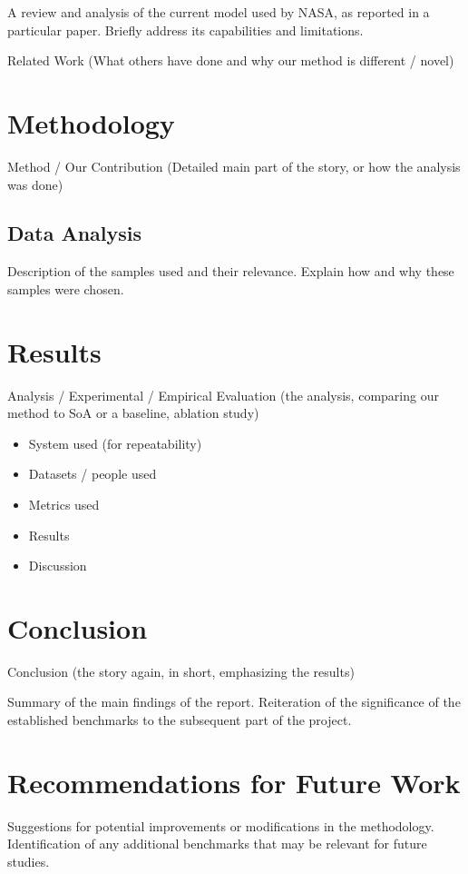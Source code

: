 A review and analysis of the current model used by NASA, as reported in a particular paper.
Briefly address its capabilities and limitations.

Related Work (What others have done and why our method is different / novel)

\section{Methodology}
Method / Our Contribution (Detailed main part of the story, or how the analysis was done)

\subsection{Data Analysis}
Description of the samples used and their relevance.
Explain how and why these samples were chosen.

\section{Results}
Analysis / Experimental / Empirical Evaluation (the analysis, comparing our method to SoA or a baseline, ablation study)
\begin{itemize}
    \item System used (for repeatability)
    \item Datasets / people used
    \item Metrics used
    \item Results
    \item Discussion
\end{itemize}

\section{Conclusion}
Conclusion (the story again, in short, emphasizing the results)

Summary of the main findings of the report.
Reiteration of the significance of the established benchmarks to the subsequent part of the project.

\section{Recommendations for Future Work}
Suggestions for potential improvements or modifications in the methodology.
Identification of any additional benchmarks that may be relevant for future studies.

